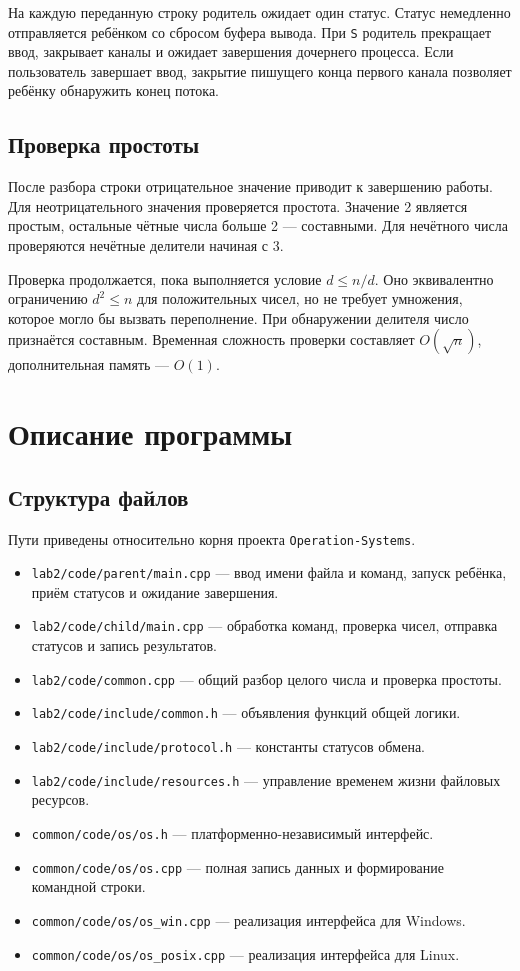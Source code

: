 На каждую переданную строку родитель ожидает один статус. Статус немедленно отправляется ребёнком со сбросом буфера вывода. При \texttt{S} родитель прекращает ввод, закрывает каналы и ожидает завершения дочернего процесса. Если пользователь завершает ввод, закрытие пишущего конца первого канала позволяет ребёнку обнаружить конец потока.

\subsection{Проверка простоты}
После разбора строки отрицательное значение приводит к завершению работы. Для неотрицательного значения проверяется простота. Значение 2 является простым, остальные чётные числа больше 2 --- составными. Для нечётного числа проверяются нечётные делители начиная с 3.

Проверка продолжается, пока выполняется условие \(d \leq n/d\). Оно эквивалентно ограничению \(d^2 \leq n\) для положительных чисел, но не требует умножения, которое могло бы вызвать переполнение. При обнаружении делителя число признаётся составным. Временная сложность проверки составляет \(O(\sqrt{n})\), дополнительная память --- \(O(1)\).

\section{Описание программы}
\subsection{Структура файлов}
Пути приведены относительно корня проекта \texttt{Operation-Systems}.

\begin{itemize}
\item \texttt{lab2/code/parent/main.cpp} --- ввод имени файла и команд, запуск ребёнка, приём статусов и ожидание завершения.
\item \texttt{lab2/code/child/main.cpp} --- обработка команд, проверка чисел, отправка статусов и запись результатов.
\item \texttt{lab2/code/common.cpp} --- общий разбор целого числа и проверка простоты.
\item \texttt{lab2/code/include/common.h} --- объявления функций общей логики.
\item \texttt{lab2/code/include/protocol.h} --- константы статусов обмена.
\item \texttt{lab2/code/include/resources.h} --- управление временем жизни файловых ресурсов.
\item \texttt{common/code/os/os.h} --- платформенно-независимый интерфейс.
\item \texttt{common/code/os/os.cpp} --- полная запись данных и формирование командной строки.
\item \texttt{common/code/os/os\_win.cpp} --- реализация интерфейса для Windows.
\item \texttt{common/code/os/os\_posix.cpp} --- реализация интерфейса для Linux.
\end{itemize}

